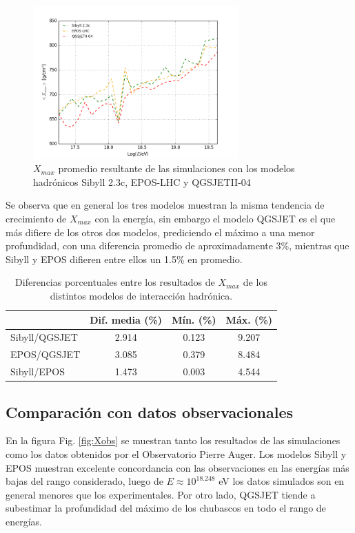 \begin{figure}[h]
\centering
\includegraphics[width=0.7\textwidth]{Figuras/Xmax_modelos} 
\caption{$X_{max}$ promedio resultante de las simulaciones con los modelos hadrónicos Sibyll 2.3c, EPOS-LHC y QGSJETII-04}
\label{fig:Xmodelos}
\end{figure}	

Se observa que en general los tres modelos muestran la misma tendencia de crecimiento de $X_{max}$ con la energía, sin embargo el modelo QGSJET es el que más difiere de los otros dos modelos, prediciendo el máximo a una menor profundidad, con una diferencia promedio de aproximadamente 3\%, mientras que Sibyll y EPOS difieren entre ellos un 1.5\% en promedio.

\begin{table}[h]
\centering
\caption{Diferencias porcentuales entre los resultados de $X_{max}$ de los distintos modelos de interacción hadrónica.}
\begin{tabular}{l|ccc}
\hline
              & \multicolumn{1}{l}{Dif. media (\%)} & \multicolumn{1}{l}{Mín. (\%)} & \multicolumn{1}{l}{Máx. (\%)} \\ \hline
Sibyll/QGSJET & 2.914                               & 0.123                         & 9.207                         \\ \hline
EPOS/QGSJET   & 3.085                               & 0.379                         & 8.484                         \\ \hline
Sibyll/EPOS   & 1.473                               & 0.003                         & 4.544  						  \\ \hline 
\end{tabular}
\label{modeldif} 
\end{table}

\subsection{Comparación con datos observacionales}
En la figura Fig. \ref{fig:Xobs} se muestran tanto los resultados de las simulaciones como los datos obtenidos por el Observatorio Pierre Auger. Los modelos Sibyll y EPOS muestran excelente concordancia con las observaciones en las energías más bajas del rango considerado, luego de $E\approx 10^{18.248}$ eV los datos simulados son en general menores que los experimentales. Por otro lado, QGSJET tiende a subestimar la profundidad del máximo de los chubascos en todo el rango de energías.\\

